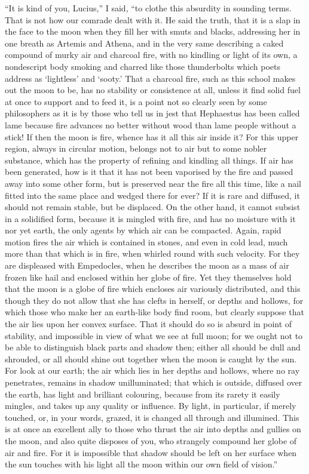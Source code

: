 \documentclass[a4paper, 11pt, oneside, polutonikogreek, english]{article}
\begin{document}
``It is kind of you, Lucius,'' I said, ``to clothe this absurdity in sounding terms. That is not how our comrade dealt with it. He said the truth, that it is a slap in the face to the moon when they fill her with smuts and blacks, addressing her in one breath as Artemis and Athena, and in the very same describing a caked compound of murky air and charcoal fire, with no kindling or light of its own, a nondescript body smoking and charred like those thunderbolts which poets address as `lightless' and `sooty.' That a charcoal fire, such as this school makes out the moon to be, has no stability or consistence at all, unless it find solid fuel at once to support and to feed it, is a point not so clearly seen by some philosophers as it is by those who tell us in jest that Hephaestus has been called lame because fire advances no better without wood than lame people without a stick! If then the moon is fire, whence has it all this air inside it? For this upper region, always in circular motion, belongs not to air but to some nobler substance, which has the property of refining and kindling all things. If air has been generated, how is it that it has not been vaporised by the fire and passed away into some other form, but is preserved near the fire all this time, like a nail fitted into the same place and wedged there for ever? If it is rare and diffused, it should not remain stable, but be displaced. On the other hand, it cannot subsist in a solidified form, because it is mingled with fire, and has no moisture with it nor yet earth, the only agents by which air can be compacted. Again, rapid motion fires the air which is contained in stones, and even in cold lead, much more than that which is in fire, when whirled round with such velocity. For they are displeased with Empedocles, when he describes the moon as a mass of air frozen like hail and enclosed within her globe of fire. Yet they themselves hold that the moon is a globe of fire which encloses air variously distributed, and this though they do not allow that she has clefts in herself, or depths and hollows, for which those who make her an earth-like body find room, but clearly suppose that the air lies upon her convex surface. That it should do so is absurd in point of stability, and impossible in view of what we see at full moon; for we ought not to be able to distinguish black parts and shadow then; either all should be dull and shrouded, or all should shine out together when the moon is caught by the sun. For look at our earth; the air which lies in her depths and hollows, where no ray penetrates, remains in shadow unilluminated; that which is outside, diffused over the earth, has light and brilliant colouring, because from its rarety it easily mingles, and takes up any quality or influence. By light, in particular, if merely touched, or, in your words, grazed, it is changed all through and illumined. This is at once an excellent ally to those who thrust the air into depths and gullies on the moon, and also quite disposes of you, who strangely compound her globe of air and fire. For it is impossible that shadow should be left on her surface when the sun touches with his light all the moon within our own field of vision.''
\end{document}
